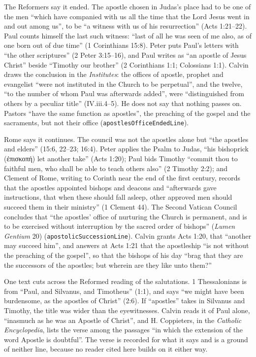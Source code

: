 \documentclass[11pt]{article}
\begin{document}
The Reformers say it ended. The apostle chosen in Judas’s place had to be one of the men “which have companied with us all the time that the Lord Jesus went in and out among us”, to be “a witness with us of his resurrection” (Acts 1:21–22). Paul counts himself the last such witness: “last of all he was seen of me also, as of one born out of due time” (1 Corinthians 15:8). Peter puts Paul’s letters with “the other scriptures” (2 Peter 3:15–16), and Paul writes as “an apostle of Jesus Christ” beside “Timothy our brother” (2 Corinthians 1:1; Colossians 1:1). Calvin draws the conclusion in the \emph{Institutes}: the offices of apostle, prophet and evangelist “were not instituted in the Church to be perpetual”, and the twelve, “to the number of whom Paul was afterwards added”, were “distinguished from others by a peculiar title” (IV.iii.4–5). He does not say that nothing passes on. Pastors “have the same function as apostles”, the preaching of the gospel and the sacraments, but not their office (\texttt{apostles\allowbreak{}Office\allowbreak{}Ended\allowbreak{}Line}).

Rome says it continues. The council was not the apostles alone but “the apostles and elders” (15:6, 22–23; 16:4). Peter applies the Psalm to Judas, “his bishoprick (ἐπισκοπή) let another take” (Acts 1:20); Paul bids Timothy “commit thou to faithful men, who shall be able to teach others also” (2 Timothy 2:2); and Clement of Rome, writing to Corinth near the end of the first century, records that the apostles appointed bishops and deacons and “afterwards gave instructions, that when these should fall asleep, other approved men should succeed them in their ministry” (1 Clement 44). The Second Vatican Council concludes that “the apostles’ office of nurturing the Church is permanent, and is to be exercised without interruption by the sacred order of bishops” (\emph{Lumen Gentium} 20) (\texttt{apostolic\allowbreak{}Succession\allowbreak{}Line}). Calvin grants Acts 1:20, that “another may succeed him”, and answers at Acts 1:21 that the apostleship “is not without the preaching of the gospel”, so that the bishops of his day “brag that they are the successors of the apostles; but wherein are they like unto them?”

One text cuts across the Reformed reading of the salutations. 1 Thessalonians is from “Paul, and Silvanus, and Timotheus” (1:1), and says “we might have been burdensome, as the apostles of Christ” (2:6). If “apostles” takes in Silvanus and Timothy, the title was wider than the eyewitnesses. Calvin reads it of Paul alone, “inasmuch as he was an Apostle of Christ”, and H. Coppieters, in the \emph{Catholic Encyclopedia}, lists the verse among the passages “in which the extension of the word Apostle is doubtful”. The verse is recorded for what it says and is a ground of neither line, because no reader cited here builds on it either way.
\end{document}
